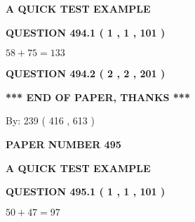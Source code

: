\documentclass[12pt]{article}
\begin{document}
   
   
   
 \vspace{0.2in}
{\LARGE {\textbf{ A QUICK TEST EXAMPLE}}}
   
   
  
\vspace{0.2in}
  
{\textbf{\Large{QUESTION
494.1 
 ( 1 , 1 , 101 )
}}}
  
  
 
 

$ %
58 +  %
75=   %
133$
 
 
  
\vspace{0.2in}
  
{\textbf{\Large{QUESTION
494.2 
 ( 2 , 2 , 201 )
}}}
  
  
   
   
 \vspace{0.2in}
 
   
   
   
   
\vspace{1.0in} 
{\textbf{\large{ *** END OF PAPER, THANKS *** }}} 
   
   
\hspace{1.0in} By: 
 239 ( 416 ,  613 )
   
   
   
   
\newpage 
\setcounter{page}{ 
   495001 } 
   
   
   
   
 {\textbf{ \Large{ PAPER NUMBER  495  }}}
   
   
\vspace{0.2in}
   
   
   
   
   
   
 \vspace{0.2in}
{\LARGE {\textbf{ A QUICK TEST EXAMPLE}}}
   
   
  
\vspace{0.2in}
  
{\textbf{\Large{QUESTION
495.1 
 ( 1 , 1 , 101 )
}}}
  
  
 
 

$ %
50 +  %
47=   %
97$
 
 
  
\vspace{0.2in}
  
\end{document}
